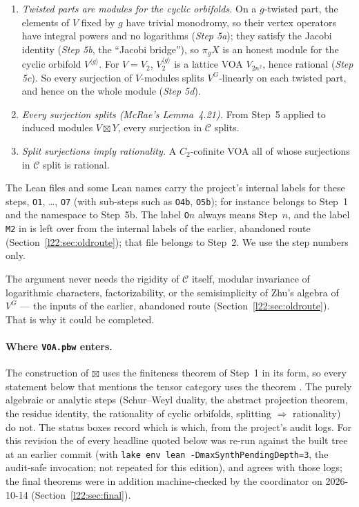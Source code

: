 \begin{enumerate}
  $\pi_g$ onto the twisted parts.
\item[Step 5.] \emph{Twisted parts are modules for the cyclic orbifolds.} On a $g$-twisted part, the elements of $V$
  fixed by $g$ have trivial monodromy, so their vertex operators
  have integral powers and no logarithms (\emph{Step 5a}); they satisfy the Jacobi identity (\emph{Step 5b}, the
  ``Jacobi bridge''), so $\pi_gX$ is an honest module for
  the cyclic orbifold $V^{\langle g\rangle}$. For $V=V_2$, $V_2^{\langle g\rangle}$ is a lattice VOA $V_{2n^2}$, hence
  rational (\emph{Step 5c}). So every surjection of $V$-modules splits $V^G$-linearly on each twisted part, and hence
  on the whole module (\emph{Step 5d}).
\item[Step 6.] \emph{Every surjection splits (McRae's Lemma~4.21).} From Step~5 applied to induced modules
  $V\boxtimes Y$, every surjection in $\mathcal C$ splits.
\item[Step 7.] \emph{Split surjections imply rationality.} A $C_2$-cofinite VOA all of whose surjections in
  $\mathcal C$ split is rational.
\end{enumerate}
The Lean files and some Lean names carry the project's internal labels for these steps, \texttt{O1}, \ldots,
\texttt{O7} (with sub-steps such as \texttt{O4b}, \texttt{O5b}); for instance  belongs
to Step~1 and the namespace  to Step~5b. The label \texttt{O}$n$ always means Step~$n$, and the
label \texttt{M2} in  is left over from the internal labels of the earlier,
abandoned route (Section~\ref{l22:sec:oldroute}); that file belongs to Step~2. We use the step numbers only.

The argument never needs the rigidity of $\mathcal C$ itself, modular invariance of logarithmic characters,
factorizability, or the semisimplicity of Zhu's algebra of $V^G$ --- the inputs of the earlier, abandoned route
(Section~\ref{l22:sec:oldroute}). That is why it could be completed.

\paragraph{Where \texttt{VOA.pbw} enters.} The construction of $\boxtimes$ uses the finiteness theorem of Step~1 in its
 form, so every statement below that mentions the tensor category uses the theorem . The purely
algebraic or analytic steps (Schur--Weyl duality, the abstract projection theorem, the residue identity, the
rationality of cyclic orbifolds, splitting $\Rightarrow$ rationality) do not. The status boxes record which is which,
from the project's audit logs. For this revision the  of every headline
quoted below was re-run against the built tree at an earlier commit (with \texttt{lake env lean
-DmaxSynthPendingDepth=3}, the audit-safe invocation; not repeated for this edition), and agrees with those logs; the final theorems were in addition
machine-checked by the coordinator on 2026-10-14 (Section~\ref{l22:sec:final}).

